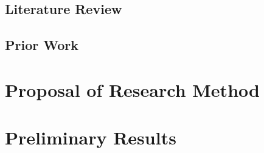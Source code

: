\subsection{Literature Review}

\subsection{Prior Work}

\section{Proposal of Research Method}

\section{Preliminary Results}



